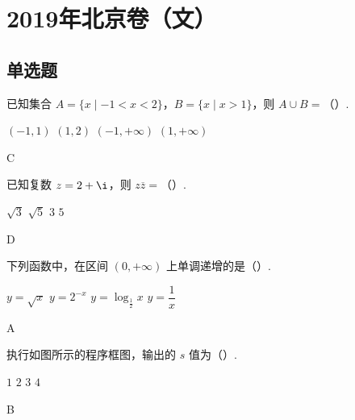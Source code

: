 
\chapter{2019年北京卷（文）}

\section{单选题}

\begin{problem}
已知集合 \(A=\{x\mid -1<x<2\}\)，\(B=\{x\mid x>1\}\)，则 \(A\cup B=\)（\quad）.

\choices
    {\(\left(-1,1\right)\)}
    {\(\left(1,2\right)\)}
    {\(\left(-1,+\infty\right)\)}
    {\(\left(1,+\infty\right)\)}
\end{problem}

\begin{answer}
C
\end{answer}

\begin{problem}
已知复数 \(z=2+\i\)，则 \(z\overline z=\)（\quad）.

\choices
    {\(\sqrt3\)}
    {\(\sqrt5\)}
    {\(3\)}
    {\(5\)}
\end{problem}

\begin{answer}
D
\end{answer}

\begin{problem}
下列函数中，在区间 \(\left(0,+\infty\right)\) 上单调递增的是（\quad）.

\choices
    {\(y=\sqrt{x}\)}
    {\(y=2^{-x}\)}
    {\(y=\log_{\frac12}x\)}
    {\(y=\dfrac1x\)}
\end{problem}

\begin{answer}
A
\end{answer}

\begin{problem}
执行如图所示的程序框图，输出的 \(s\) 值为（\quad）.


\choices
    {\(1\)}
    {\(2\)}
    {\(3\)}
    {\(4\)}
\end{problem}

\begin{answer}
B
\end{answer}

